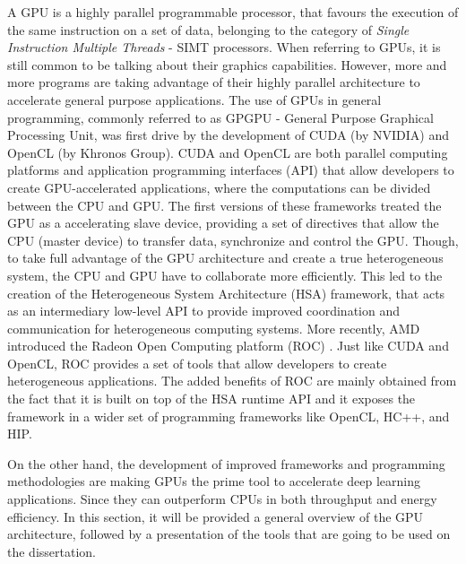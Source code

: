 A GPU is a highly parallel programmable processor, that favours the execution of the same instruction on a set of data, belonging to the category of \textit{Single Instruction Multiple Threads} - SIMT processors. When referring to GPUs, it is still common to be talking about their graphics capabilities. However, more and more programs are taking advantage of their highly parallel architecture to accelerate general purpose applications. The use of GPUs in general programming, commonly referred to as GPGPU - General Purpose Graphical Processing Unit, was first drive by the development of CUDA \cite{nvidia_cuda_2017} (by NVIDIA) and OpenCL \cite{noauthor_opencl_2013} (by Khronos Group). CUDA and OpenCL are both parallel computing platforms and application programming interfaces (API) that allow developers to create GPU-accelerated applications, where the computations can be divided between the CPU and GPU. The first versions of these frameworks treated the GPU as a accelerating slave device, providing a set of directives that allow the CPU (master device) to transfer data, synchronize and control the GPU.  Though, to take full advantage of the GPU architecture and create a true heterogeneous system, the CPU and GPU have to collaborate more efficiently. This led to the creation of the Heterogeneous System Architecture (HSA) \cite{hwu_heterogeneous_2015} framework, that acts as an intermediary low-level API to provide improved coordination and communication for heterogeneous computing systems.  More recently, AMD introduced the Radeon Open Computing platform (ROC) \cite{noauthor_radeonopencompute/rocm_2019}. Just like CUDA and OpenCL, ROC provides a set of tools that allow developers to create heterogeneous applications. The added benefits of ROC are  mainly obtained from the fact that it is built on top of the HSA runtime API and it exposes the framework in a wider set of programming frameworks like OpenCL, HC++, and HIP.

On the other hand, the development of improved frameworks and programming methodologies are making GPUs the prime tool to accelerate deep learning applications. Since they can outperform CPUs in both throughput and energy efficiency. In this section, it will be provided a general overview of the GPU architecture, followed by a presentation of the tools that are going to be used on the dissertation.



